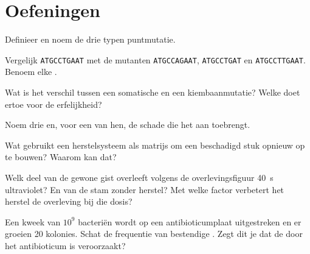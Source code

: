 \section{Oefeningen}

\begin{exercise}[$\star$]\label{exo:g11:mutations:1}
Definieer  en noem de drie typen puntmutatie.
\end{exercise}

\begin{exercise}[$\star$]\label{exo:g11:mutations:2}
Vergelijk \texttt{ATGCCTGAAT} met de mutanten \texttt{ATGCCAGAAT},
\texttt{ATGCCTGAT} en \texttt{ATGCCTTGAAT}. Benoem elke .
\end{exercise}

\begin{exercise}[$\star$]\label{exo:g11:mutations:3}
Wat is het verschil tussen een somatische  en een kiembaanmutatie?
Welke doet ertoe voor de erfelijkheid?
\end{exercise}

\begin{exercise}[$\star$]\label{exo:g11:mutations:4}
Noem drie  en, voor een van hen, de schade die het aan 
toebrengt.
\end{exercise}

\begin{exercise}[$\star$]\label{exo:g11:mutations:5}
Wat gebruikt een herstelsysteem als matrijs om een beschadigd stuk
opnieuw op te bouwen? Waarom kan dat?
\end{exercise}

\begin{exercise}[$\star\star$]\label{exo:g11:mutations:6}
Welk deel van de gewone gist overleeft volgens de overlevingsfiguur
\qty{40}{s} ultraviolet? En van de stam zonder herstel? Met welke factor
verbetert het herstel de overleving bij die dosis?
\end{exercise}

\begin{exercise}[$\star\star$]\label{exo:g11:mutations:7}
Een kweek van $10^9$ bacteriën wordt op een antibioticumplaat uitgestreken
en er groeien 20 kolonies. Schat de frequentie van bestendige .
Zegt dit je dat de  door het antibioticum is veroorzaakt?
\end{exercise}

